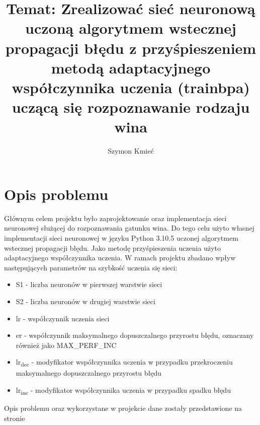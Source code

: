 \documentclass[12pt,twoside]{article}
\title{Temat: Zrealizować sieć neuronową uczoną algorytmem wstecznej propagacji błędu z przyśpieszeniem metodą adaptacyjnego współczynnika uczenia (trainbpa)
uczącą się rozpoznawanie rodzaju wina}
\author{Szymon Kmieć}
\begin{document}
\maketitle

\blankpage

\tableofcontents

\clearpage
\blankpage


\section{Opis problemu}
Głównym celem projektu było zaprojektowanie oraz implementacja sieci neuronowej służącej do rozpoznawania gatunku wina. Do tego celu użyto własnej implementacji sieci neuronowej w języku Python 3.10.5 uczonej algorytmem wstecznej propagacji błędu. Jako metodę przyśpieszenia uczenia użyto adaptacyjnego współczynnika uczenia. W ramach projektu zbadano wpływ następujących parametrów na szybkość uczenia się sieci: 

\begin{itemize}
	\item S1 - liczba neuronów w pierwszej warstwie sieci
\item S2 - liczba neuronów w drugiej warstwie sieci
\item lr - współczynnik uczenia sieci
\item er - współczynnik maksymalnego dopuszczalnego przyrostu błędu, oznaczany również jako MAX\_PERF\_INC
\item lr\textsubscript{dec} - modyfikator współczynnika uczenia w przypadku przekroczeniu maksymalnego dopuszczalnego przyrostu błędu
\item lr\textsubscript{inc} - modyfikator współczynnika uczenia w przypadku spadku błędu
\end{itemize}

Opis problemu oraz wykorzystane w projekcie dane zostały przedstawione na stronie \cite{dane}

\clearpage
\end{document}
